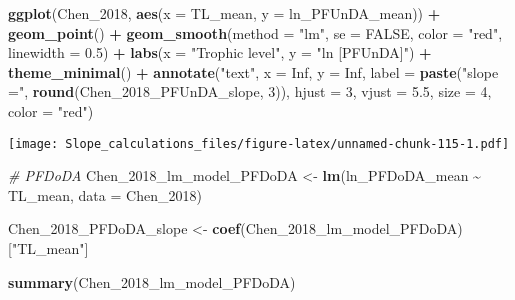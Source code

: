 \documentclass[
]{article}
\newenvironment{Shaded}{\begin{snugshade}}{\end{snugshade}}
\newcommand{\AttributeTok}[1]{\textcolor[rgb]{0.13,0.29,0.53}{#1}}
\newcommand{\CommentTok}[1]{\textcolor[rgb]{0.56,0.35,0.01}{\textit{#1}}}
\newcommand{\ConstantTok}[1]{\textcolor[rgb]{0.56,0.35,0.01}{#1}}
\newcommand{\DecValTok}[1]{\textcolor[rgb]{0.00,0.00,0.81}{#1}}
\newcommand{\FloatTok}[1]{\textcolor[rgb]{0.00,0.00,0.81}{#1}}
\newcommand{\FunctionTok}[1]{\textcolor[rgb]{0.13,0.29,0.53}{\textbf{#1}}}
\newcommand{\NormalTok}[1]{#1}
\newcommand{\OtherTok}[1]{\textcolor[rgb]{0.56,0.35,0.01}{#1}}
\newcommand{\SpecialCharTok}[1]{\textcolor[rgb]{0.81,0.36,0.00}{\textbf{#1}}}
\newcommand{\StringTok}[1]{\textcolor[rgb]{0.31,0.60,0.02}{#1}}
\begin{document}
\begin{Shaded}
\begin{Highlighting}[]
\FunctionTok{ggplot}\NormalTok{(Chen\_2018, }\FunctionTok{aes}\NormalTok{(}\AttributeTok{x =}\NormalTok{ TL\_mean, }\AttributeTok{y =}\NormalTok{ ln\_PFUnDA\_mean)) }\SpecialCharTok{+}
  \FunctionTok{geom\_point}\NormalTok{() }\SpecialCharTok{+}
  \FunctionTok{geom\_smooth}\NormalTok{(}\AttributeTok{method =} \StringTok{"lm"}\NormalTok{, }\AttributeTok{se =} \ConstantTok{FALSE}\NormalTok{, }\AttributeTok{color =} \StringTok{"red"}\NormalTok{, }\AttributeTok{linewidth =} \FloatTok{0.5}\NormalTok{) }\SpecialCharTok{+}
  \FunctionTok{labs}\NormalTok{(}\AttributeTok{x =} \StringTok{"Trophic level"}\NormalTok{,}
       \AttributeTok{y =} \StringTok{"ln [PFUnDA]"}\NormalTok{) }\SpecialCharTok{+}
  \FunctionTok{theme\_minimal}\NormalTok{() }\SpecialCharTok{+}
  \FunctionTok{annotate}\NormalTok{(}\StringTok{"text"}\NormalTok{, }\AttributeTok{x =} \ConstantTok{Inf}\NormalTok{, }\AttributeTok{y =} \ConstantTok{Inf}\NormalTok{, }\AttributeTok{label =} \FunctionTok{paste}\NormalTok{(}\StringTok{"slope ="}\NormalTok{, }\FunctionTok{round}\NormalTok{(Chen\_2018\_PFUnDA\_slope, }\DecValTok{3}\NormalTok{)), }
           \AttributeTok{hjust =} \DecValTok{3}\NormalTok{, }\AttributeTok{vjust =} \FloatTok{5.5}\NormalTok{, }\AttributeTok{size =} \DecValTok{4}\NormalTok{, }\AttributeTok{color =} \StringTok{"red"}\NormalTok{)}
\end{Highlighting}
\end{Shaded}

\texttt{[image: Slope\_calculations\_files/figure-latex/unnamed-chunk-115-1.pdf]}

\begin{Shaded}
\begin{Highlighting}[]
\CommentTok{\# PFDoDA}
\NormalTok{Chen\_2018\_lm\_model\_PFDoDA }\OtherTok{\textless{}{-}} \FunctionTok{lm}\NormalTok{(ln\_PFDoDA\_mean }\SpecialCharTok{\textasciitilde{}}\NormalTok{ TL\_mean,}
                             \AttributeTok{data =}\NormalTok{ Chen\_2018)}

\NormalTok{Chen\_2018\_PFDoDA\_slope }\OtherTok{\textless{}{-}} \FunctionTok{coef}\NormalTok{(Chen\_2018\_lm\_model\_PFDoDA)[}\StringTok{"TL\_mean"}\NormalTok{]}

\FunctionTok{summary}\NormalTok{(Chen\_2018\_lm\_model\_PFDoDA)}
\end{Highlighting}
\end{Shaded}
\end{document}
